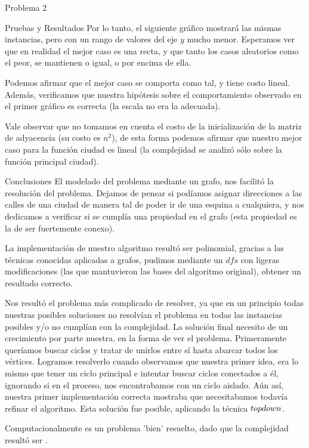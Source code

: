 \begin{section}{Problema 2}
\begin{subsection}{Pruebas y Resultados}
		Por lo tanto, el siguiente gráfico mostrará las mismas instancias, pero con un rango de valores del eje $y$ mucho menor. Esperamos ver que en realidad el mejor caso es una recta, y que tanto los casos aleatorios como el peor, se mantienen o igual, o por encima de ella.


		Podemos afirmar que el mejor caso se comporta como tal, y tiene costo lineal. Además, verificamos que nuestra hipótesis sobre el comportamiento observado en el primer gráfico es correcta (la escala no era la adecuada).

		Vale observar que no tomamos en cuenta el costo de la inicialización de la matriz de adyacencia (su costo es $n^2$), de esta forma podemos afirmar que nuestro mejor caso para la función ciudad es lineal (la complejidad se analizó sólo sobre la función principal ciudad).

	\end{subsection}

	\begin{subsection}{Conclusiones}
		El modelado del problema mediante un grafo, nos facilitó la resolución del problema. Dejamos de pensar si podíamos asignar direcciones a las calles de una ciudad de manera tal de poder ir de una esquina a cualquiera, y nos dedicamos a verificar si se cumplía una propiedad en el grafo (esta propiedad es la de ser fuertemente conexo).

		La implementación de nuestro algoritmo resultó ser polinomial, gracias a las técnicas conocidas aplicadas a grafos, pudimos mediante un $dfs$ con ligeras modificaciones (las que mantuvieron las bases del algoritmo original), obtener un resultado correcto. 

		Nos resultó el problema más complicado de resolver, ya que en un principio todas nuestras posibles soluciones no resolvían el problema en todas las instancias posibles y/o no cumplían con la complejidad. La solución final necesito de un crecimiento por parte nuestra, en la forma de ver el problema. Primeramente queríamos buscar ciclos y tratar de unirlos entre sí hasta abarcar todos los vértices. Logramos resolverlo cuando observamos que nuestra primer idea, era lo mismo que tener un ciclo principal e intentar buscar ciclos conectados a él, ignorando si en el proceso, nos encontrabamos con un ciclo aislado. Aún así, nuestra primer implementación correcta mostraba que necesitabamos todavía refinar el algoritmo. Esta solución fue posible, aplicando la técnica $top\-down$.

		Computacionalmente es un problema 'bien' resuelto, dado que la complejidad resultó ser .

	\end{subsection}
\end{section}


